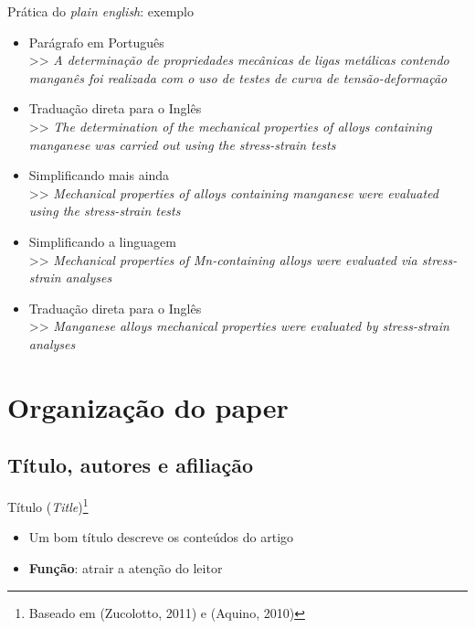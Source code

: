 \begin{frame}{Prática do \emph{plain english}: exemplo}
\begin{itemize}
\item Parágrafo em Português \\
>> \textit{A determinação de propriedades mecânicas de ligas metálicas contendo manganês foi realizada com o uso de testes de curva de tensão-deformação}
\item Traduação direta para o Inglês  \\
>> \textit{The determination of the mechanical properties of alloys containing manganese was carried out using the stress-strain tests}
\item Simplificando mais ainda  \\
>> \textit{Mechanical properties of alloys containing manganese were evaluated using the stress-strain tests}
\end{itemize}
\end{frame}

\begin{frame}
\begin{itemize}
\item Simplificando a linguagem \\
>> \textit{Mechanical properties of Mn-containing alloys were evaluated via stress-strain analyses}
\item Traduação direta para o Inglês  \\
>> \textit{Manganese alloys mechanical properties were evaluated by stress-strain analyses}
\end{itemize}
\end{frame}

\section{Organização do paper}

\subsection{Título, autores e afiliação}

\begin{frame}{Título (\emph{Title})\footnote{Baseado em (Zucolotto, 2011) e (Aquino, 2010) }}
\begin{itemize}
\item Um bom título descreve os conteúdos do artigo
\item \textbf{Função}: atrair a atenção do leitor
\end{itemize}
\end{frame}

